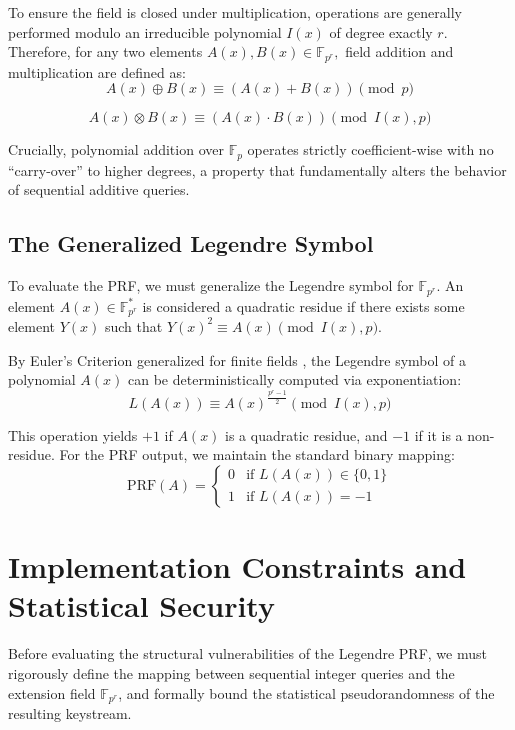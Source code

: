 \documentclass[runningheads]{llncs}
\begin{document}
To ensure the field is closed under multiplication, operations are generally performed modulo an irreducible polynomial $I(x)$ of degree exactly $r$. Therefore, for any two elements $A(x), B(x) \in \mathbb{F}_{p^r},$ field addition and multiplication are defined as:
\begin{equation*}
    A(x) \oplus B(x) \equiv (A(x) + B(x)) \pmod p
\end{equation*}

\begin{equation*}
    A(x)\otimes B(x) \equiv (A(x)\cdot B(x)) \pmod {I(x), p}
\end{equation*}

Crucially, polynomial addition over $\mathbb{F}_p$ operates strictly coefficient-wise with no \enquote{carry-over} to higher degrees, a property that fundamentally alters the behavior of sequential additive queries.

\subsection{The Generalized Legendre Symbol}
To evaluate the PRF, we must generalize the Legendre symbol for $\mathbb{F}_{p^r}.$ An element $A(x) \in \mathbb{F}^*_{p^r}$ is considered a quadratic residue if there exists some element $Y(x)$ such that $Y(x)^2 \equiv A(x) \pmod {I(x), p}$.

By Euler's Criterion generalized for finite fields \cite{lidl1997}, the Legendre symbol of a polynomial $A(x)$ can be deterministically computed via exponentiation:
\begin{equation*}
    L(A(x)) \equiv A(x)^{\frac{p^r - 1}{2}} \pmod{ I(x), p}
\end{equation*}

This operation yields $+1$ if $A(x)$ is a quadratic residue, and $-1$ if it is a non-residue. For the PRF output, we maintain the standard binary mapping:
\begin{equation*}
\mathrm{PRF}(A) =
\begin{cases}
0 & \text{if } L(A(x)) \in \{0,1\} \\
1 & \text{if } L(A(x)) = -1
\end{cases}
\end{equation*}

\section{Implementation Constraints and Statistical Security}
Before evaluating the structural vulnerabilities of the Legendre PRF, we must rigorously define the mapping between sequential integer queries and the extension field $\mathbb{F}_{p^r}$, and formally bound the statistical pseudorandomness of the resulting keystream.
\end{document}
